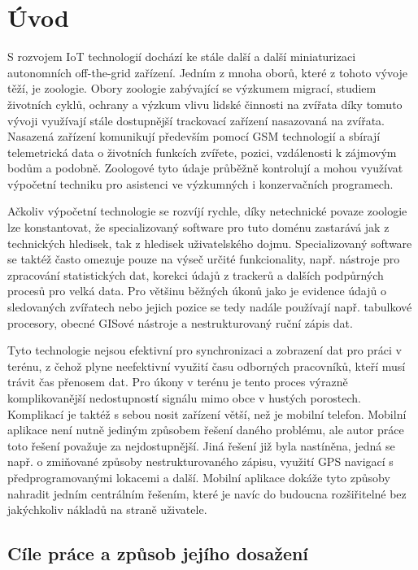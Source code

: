 \chapter*{Úvod}

S rozvojem IoT technologií dochází ke stále další a další miniaturizaci autonomních off-the-grid zařízení. Jedním z mnoha oborů, které z tohoto vývoje těží, je zoologie. Obory zoologie zabývající se výzkumem migrací, studiem životních cyklů, ochrany a výzkum vlivu lidské činnosti na zvířata díky tomuto vývoji využívají stále dostupnější trackovací zařízení nasazovaná na zvířata. Nasazená zařízení komunikují především pomocí GSM technologií a sbírají telemetrická data o životních funkcích zvířete, pozici, vzdálenosti k zájmovým bodům a podobně. Zoologové tyto údaje průběžně kontrolují a mohou využívat výpočetní techniku pro asistenci ve výzkumných i konzervačních programech.

Ačkoliv výpočetní technologie se rozvíjí rychle, díky netechnické povaze zoologie lze konstantovat, že specializovaný software pro tuto doménu zastarává jak z technických hledisek, tak z hledisek uživatelského dojmu. Specializovaný software se taktéž často omezuje pouze na výseč určité funkcionality, např. nástroje pro zpracování statistických dat, korekci údajů z trackerů a dalších podpůrných procesů pro velká data. Pro většinu běžných úkonů jako je evidence údajů o sledovaných zvířatech nebo jejich pozice se tedy nadále používají např. tabulkové procesory, obecné GISové nástroje a nestrukturovaný ruční zápis dat.

Tyto technologie nejsou efektivní pro synchronizaci a zobrazení dat pro práci v terénu, z čehož plyne neefektivní využití času odborných pracovníků, kteří musí trávit čas přenosem dat. Pro úkony v terénu je tento proces výrazně komplikovanější nedostupností signálu mimo obce v hustých porostech. Komplikací je taktéž s sebou nosit zařízení větší, než je mobilní telefon. Mobilní aplikace není nutně jediným způsobem řešení daného problému, ale autor práce toto řešení považuje za nejdostupnější. Jiná řešení již byla nastíněna, jedná se např. o zmiňované způsoby nestrukturovaného zápisu, využití GPS navigací s předprogramovanými lokacemi a další. Mobilní aplikace dokáže tyto způsoby nahradit jedním centrálním řešením, které je navíc do budoucna rozšiřitelné bez jakýchkoliv nákladů na straně uživatele. 

\section*{Cíle práce a způsob jejího dosažení}

